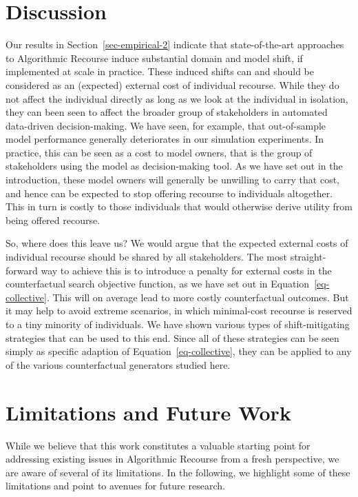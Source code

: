 \documentclass[
  conference]{IEEEtran}
\begin{document}
\hypertarget{sec-discussion}{%
\section{Discussion}\label{sec-discussion}}

Our results in Section~\ref{sec-empirical-2} indicate that
state-of-the-art approaches to Algorithmic Recourse induce substantial
domain and model shift, if implemented at scale in practice. These
induced shifts can and should be considered as an (expected) external
cost of individual recourse. While they do not affect the individual
directly as long as we look at the individual in isolation, they can
been seen to affect the broader group of stakeholders in automated
data-driven decision-making. We have seen, for example, that
out-of-sample model performance generally deteriorates in our simulation
experiments. In practice, this can be seen as a cost to model owners,
that is the group of stakeholders using the model as decision-making
tool. As we have set out in the introduction, these model owners will
generally be unwilling to carry that cost, and hence can be expected to
stop offering recourse to individuals altogether. This in turn is costly
to those individuals that would otherwise derive utility from being
offered recourse.

So, where does this leave us? We would argue that the expected external
costs of individual recourse should be shared by all stakeholders. The
most straight-forward way to achieve this is to introduce a penalty for
external costs in the counterfactual search objective function, as we
have set out in Equation~\ref{eq-collective}. This will on average lead
to more costly counterfactual outcomes. But it may help to avoid extreme
scenarios, in which minimal-cost recourse is reserved to a tiny minority
of individuals. We have shown various types of shift-mitigating
strategies that can be used to this end. Since all of these strategies
can be seen simply as specific adaption of Equation~\ref{eq-collective},
they can be applied to any of the various counterfactual generators
studied here.

\hypertarget{sec-limit}{%
\section{Limitations and Future Work}\label{sec-limit}}

While we believe that this work constitutes a valuable starting point
for addressing existing issues in Algorithmic Recourse from a fresh
perspective, we are aware of several of its limitations. In the
following, we highlight some of these limitations and point to avenues
for future research.
\end{document}
